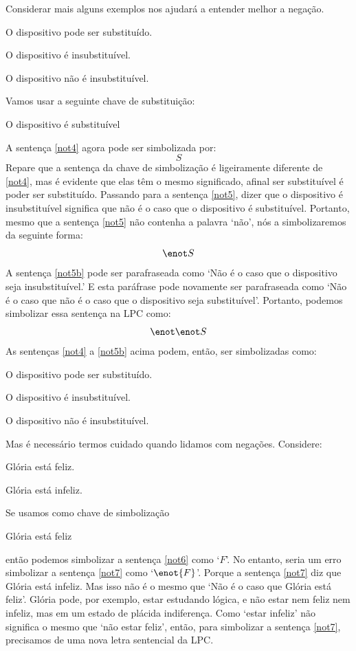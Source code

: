 \noindent Considerar mais alguns exemplos nos ajudará a entender melhor a negação.
	\begin{earg}
		\item[\ex{not4}] O dispositivo pode ser substituído.
		\item[\ex{not5}] O dispositivo é insubstituível.
		\item[\ex{not5b}] O dispositivo não é insubstituível.
	\end{earg}
Vamos usar a seguinte chave de substituição:
	\begin{ekey}
		\item[S] O dispositivo é substituível
	\end{ekey}
A sentença \ref{not4} agora pode ser simbolizada por:
$$S$$
Repare que a sentença da chave de simbolização é ligeiramente diferente de \ref{not4}, mas é evidente que elas têm o mesmo significado, afinal ser substituível é poder ser substituído.
Passando para a sentença \ref{not5}, dizer que o dispositivo é insubstituível significa que não é o caso que o dispositivo é substituível.
Portanto, mesmo que a sentença \ref{not5} não contenha a palavra `não', nós a simbolizaremos da seguinte forma: $$\enot S$$
A sentença \ref{not5b} pode ser parafraseada como `Não é o caso que o dispositivo seja insubstituível.'
E esta paráfrase pode novamente ser parafraseada como `Não é o caso que não é o caso que o dispositivo seja substituível'.
Portanto, podemos simbolizar essa sentença na LPC como:
$$\enot\enot S$$
As sentenças \ref{not4} a \ref{not5b} acima podem, então, ser simbolizadas como:
	\begin{ekey}
		\item[S] O dispositivo pode ser substituído.
		\item[$\enot$S] O dispositivo é insubstituível.
		\item[$\enot\enot$S] O dispositivo não é insubstituível.
	\end{ekey}

Mas é necessário termos cuidado quando lidamos com negações. Considere:
	\begin{earg}
		\item[\ex{not6}] Glória está feliz.
		\item[\ex{not7}] Glória está infeliz.
	\end{earg}
Se usamos como chave de simbolização
	\begin{ekey}
		\item[F] Glória está feliz
	\end{ekey}
então podemos simbolizar a sentença \ref{not6} como `$F$'.
No entanto, seria um erro simbolizar a sentença \ref{not7} como `$\enot{F}$'. 
Porque a sentença \ref{not7} diz que Glória está infeliz.
Mas isso não é o mesmo que `Não é o caso que Glória está feliz'.
Glória pode, por exemplo, estar estudando lógica, e não estar nem feliz nem infeliz, mas em um estado  de plácida indiferença.
Como `estar infeliz' não significa o mesmo que `não estar feliz', então, para simbolizar a sentença \ref{not7}, precisamos de uma nova letra sentencial da LPC.

